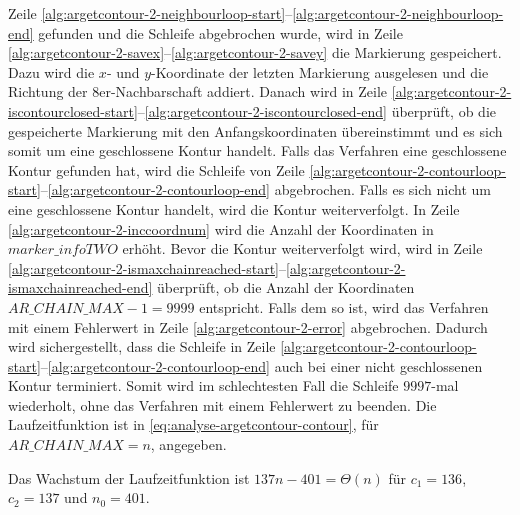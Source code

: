  Zeile \ref{alg:argetcontour-2-neighbourloop-start}--\ref{alg:argetcontour-2-neighbourloop-end} gefunden und die
 Schleife abgebrochen wurde, wird in Zeile \ref{alg:argetcontour-2-savex}--\ref{alg:argetcontour-2-savey} die
 Markierung gespeichert. Dazu wird die $x$- und $y$-Koordinate der letzten Markierung ausgelesen und die Richtung der
 8er-Nachbarschaft addiert. Danach wird in Zeile
 \ref{alg:argetcontour-2-iscontourclosed-start}--\ref{alg:argetcontour-2-iscontourclosed-end} überprüft, ob die
 gespeicherte Markierung mit den Anfangskoordinaten übereinstimmt und es sich somit um eine geschlossene Kontur
 handelt. Falls das Verfahren eine geschlossene Kontur gefunden hat, wird die Schleife von Zeile
 \ref{alg:argetcontour-2-contourloop-start}--\ref{alg:argetcontour-2-contourloop-end} abgebrochen. Falls es sich nicht
 um eine geschlossene Kontur handelt, wird die Kontur weiterverfolgt. In Zeile \ref{alg:argetcontour-2-inccoordnum}
 wird die Anzahl der Koordinaten in $\mathit{marker\_infoTWO}$ erhöht. Bevor die Kontur weiterverfolgt wird, wird in
 Zeile \ref{alg:argetcontour-2-ismaxchainreached-start}--\ref{alg:argetcontour-2-ismaxchainreached-end} überprüft, ob
 die Anzahl der Koordinaten $\mathit{AR\_CHAIN\_MAX} - 1 = 9999$ entspricht. Falls dem so ist, wird das Verfahren mit
 einem Fehlerwert in Zeile \ref{alg:argetcontour-2-error} abgebrochen. Dadurch wird sichergestellt, dass die Schleife
 in Zeile \ref{alg:argetcontour-2-contourloop-start}--\ref{alg:argetcontour-2-contourloop-end} auch bei einer nicht
 geschlossenen Kontur terminiert. Somit wird im schlechtesten Fall die Schleife $9997$-mal wiederholt, ohne das
 Verfahren mit einem Fehlerwert zu beenden. Die Laufzeitfunktion ist in \autoref{eq:analyse-argetcontour-contour},
 für $\mathit{AR\_CHAIN\_MAX} = n$, angegeben.

Das Wachstum der Laufzeitfunktion ist $137n -401 = \Theta(n)$ für $c_{1} = 136$, $c_{2} = 137$ und $n_{0} = 401$.

